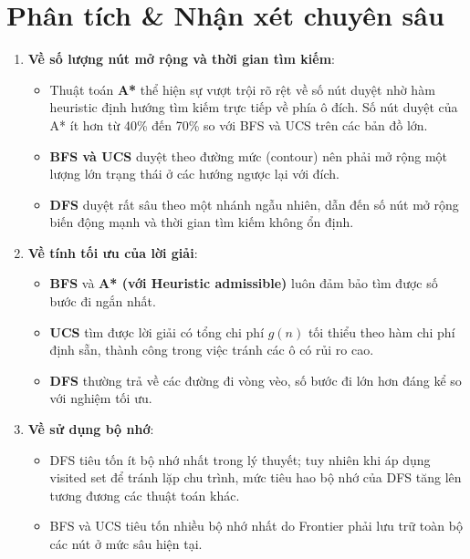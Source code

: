 \section{Phân tích \& Nhận xét chuyên sâu}
\begin{enumerate}
    \item \textbf{Về số lượng nút mở rộng và thời gian tìm kiếm}:
    \begin{itemize}
        \item Thuật toán \textbf{A*} thể hiện sự vượt trội rõ rệt về số nút duyệt nhờ hàm heuristic định hướng tìm kiếm trực tiếp về phía ô đích. Số nút duyệt của A* ít hơn từ 40\% đến 70\% so với BFS và UCS trên các bản đồ lớn.
        \item \textbf{BFS và UCS} duyệt theo đường mức (contour) nên phải mở rộng một lượng lớn trạng thái ở các hướng ngược lại với đích.
        \item \textbf{DFS} duyệt rất sâu theo một nhánh ngẫu nhiên, dẫn đến số nút mở rộng biến động mạnh và thời gian tìm kiếm không ổn định.
    \end{itemize}

    \item \textbf{Về tính tối ưu của lời giải}:
    \begin{itemize}
        \item \textbf{BFS} và \textbf{A* (với Heuristic admissible)} luôn đảm bảo tìm được số bước đi ngắn nhất.
        \item \textbf{UCS} tìm được lời giải có tổng chi phí $g(n)$ tối thiểu theo hàm chi phí định sẵn, thành công trong việc tránh các ô có rủi ro cao.
        \item \textbf{DFS} thường trả về các đường đi vòng vèo, số bước đi lớn hơn đáng kể so với nghiệm tối ưu.
    \end{itemize}

    \item \textbf{Về sử dụng bộ nhớ}:
    \begin{itemize}
        \item DFS tiêu tốn ít bộ nhớ nhất trong lý thuyết; tuy nhiên khi áp dụng visited set để tránh lặp chu trình, mức tiêu hao bộ nhớ của DFS tăng lên tương đương các thuật toán khác.
        \item BFS và UCS tiêu tốn nhiều bộ nhớ nhất do Frontier phải lưu trữ toàn bộ các nút ở mức sâu hiện tại.
    \end{itemize}
\end{enumerate}
